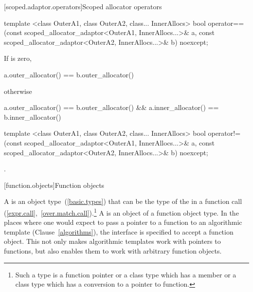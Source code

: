 [scoped.adaptor.operators]{Scoped allocator operators}

%
\begin{itemdecl}
template <class OuterA1, class OuterA2, class... InnerAllocs>
  bool operator==(const scoped_allocator_adaptor<OuterA1, InnerAllocs...>& a,
                  const scoped_allocator_adaptor<OuterA2, InnerAllocs...>& b) noexcept;
\end{itemdecl}

\begin{itemdescr}
\pnum
\returns If  is zero,
\begin{codeblock}
a.outer_allocator() == b.outer_allocator()
\end{codeblock}
otherwise
\begin{codeblock}
a.outer_allocator() == b.outer_allocator() && a.inner_allocator() == b.inner_allocator()
\end{codeblock}
\end{itemdescr}

%
\begin{itemdecl}
template <class OuterA1, class OuterA2, class... InnerAllocs>
  bool operator!=(const scoped_allocator_adaptor<OuterA1, InnerAllocs...>& a,
                  const scoped_allocator_adaptor<OuterA2, InnerAllocs...>& b) noexcept;
\end{itemdecl}

\begin{itemdescr}
\pnum
\returns {}.
\end{itemdescr}

[function.objects]{Function objects}

\pnum
A  is an object
type~(\ref{basic.types}) that can be the type of the
 in a function call
(\ref{expr.call},~\ref{over.match.call}).\footnote{Such a type is a function
pointer or a class type which has a member  or a class type
which has a conversion to a pointer to function.} A  is an
object of a function object type. In the places where one would expect to pass a
pointer to a function to an algorithmic template (Clause~\ref{algorithms}), the
interface is specified to accept a function object. This not only makes
algorithmic templates work with pointers to functions, but also enables them to
work with arbitrary function objects.

